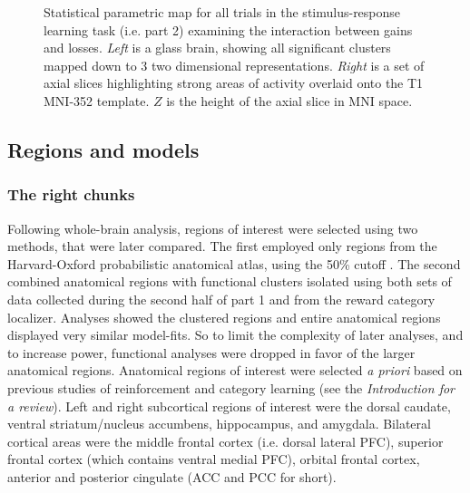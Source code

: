 \documentclass[doc,12pt]{apa}        %
\begin{document}
\begin{figure}[tp]
    \centering
	\caption{Statistical parametric map for all trials in the stimulus-response learning task (i.e. part 2) examining the interaction between gains and losses.  \emph{Left} is a glass brain, showing all significant clusters mapped down to 3 two dimensional representations.  \emph{Right} is a set of axial slices highlighting strong areas of activity overlaid onto the T1 MNI-352 template.  $Z$ is the height of the axial slice in MNI space.}
	\label{fig:gxl}
\end{figure}

\subsection{Regions and models}
\label{sub:regoins}
\subsubsection{The right chunks}
\label{subsub:chunks}
Following whole-brain analysis, regions of interest were selected using two methods, that were later compared.  The first employed only regions from the Harvard-Oxford probabilistic anatomical atlas, using the 50\% cutoff \cite{Desikan:2006p9370}.  The second combined anatomical regions with functional clusters isolated using both sets of data collected during the second half of part 1 and from the reward category localizer.  Analyses showed the clustered regions and entire anatomical regions displayed very similar model-fits.  So to limit the complexity of later analyses, and to increase power, functional analyses were dropped in favor of the larger anatomical regions.  Anatomical regions of interest were selected \emph{a priori} based on previous studies of reinforcement and category learning (see the \emph{Introduction for a review}).  Left and right subcortical regions of interest were the dorsal caudate, ventral striatum/nucleus accumbens, hippocampus, and amygdala.   Bilateral cortical areas were the middle frontal cortex (i.e. dorsal lateral PFC), superior frontal cortex (which contains ventral medial PFC), orbital frontal cortex, anterior and posterior cingulate (ACC and PCC for short).

\end{document}
